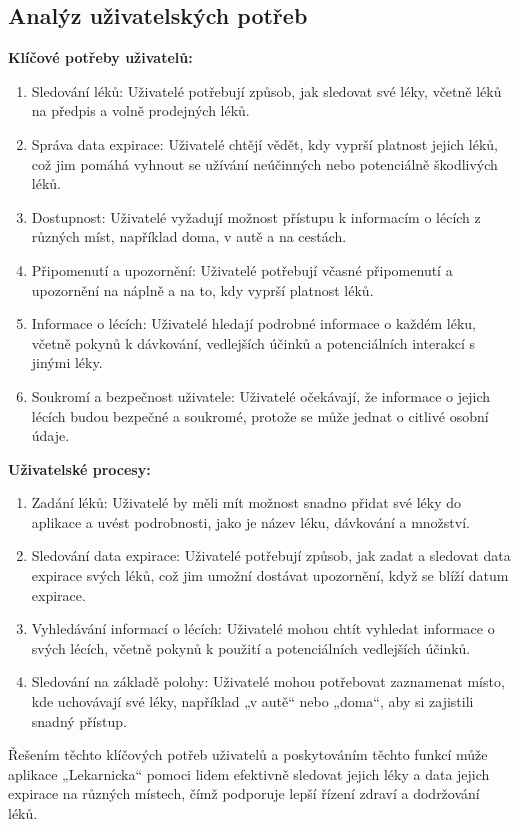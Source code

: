 \documentclass[a4paper, 11pt]{article}
\begin{document}
	\subsection{Analýz uživatelských potřeb}
	\textbf{Klíčové potřeby uživatelů:}
 \begin{enumerate}
     \item Sledování léků: Uživatelé potřebují způsob, jak sledovat své léky, včetně léků na předpis a volně prodejných léků.
     \item Správa data expirace: Uživatelé chtějí vědět, kdy vyprší platnost jejich léků, což jim pomáhá vyhnout se užívání neúčinných nebo potenciálně škodlivých léků.
     \item Dostupnost: Uživatelé vyžadují možnost přístupu k informacím o lécích z různých míst, například doma, v autě a na cestách.
     \item Připomenutí a upozornění: Uživatelé potřebují včasné připomenutí a upozornění na náplně a na to, kdy vyprší platnost léků.
     \item Informace o lécích: Uživatelé hledají podrobné informace o každém léku, včetně pokynů k dávkování, vedlejších účinků a potenciálních interakcí s jinými léky.
     \item Soukromí a bezpečnost uživatele: Uživatelé očekávají, že informace o jejich lécích budou bezpečné a soukromé, protože se může jednat o citlivé osobní údaje.
 \end{enumerate}
\textbf{Uživatelské procesy:}
\begin{enumerate}
    \item Zadání léků: Uživatelé by měli mít možnost snadno přidat své léky do aplikace a uvést podrobnosti, jako je název léku, dávkování a množství.
    \item Sledování data expirace: Uživatelé potřebují způsob, jak zadat a sledovat data expirace svých léků, což jim umožní dostávat upozornění, když se blíží datum expirace.
    \item Vyhledávání informací o lécích: Uživatelé mohou chtít vyhledat informace o svých lécích, včetně pokynů k použití a potenciálních vedlejších účinků.
    \item Sledování na základě polohy: Uživatelé mohou potřebovat zaznamenat místo, kde uchovávají své léky, například „v autě“ nebo „doma“, aby si zajistili snadný přístup.
\end{enumerate}
Řešením těchto klíčových potřeb uživatelů a poskytováním těchto funkcí může aplikace „Lekarnicka“ pomoci lidem efektivně sledovat jejich léky a data jejich expirace na různých místech, čímž podporuje lepší řízení zdraví a dodržování léků.
\end{document}

